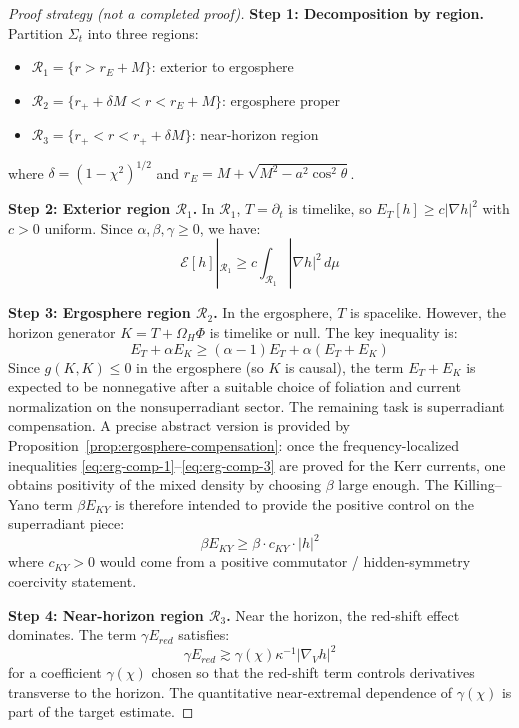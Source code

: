 \documentclass[12pt,a4paper]{article}
\begin{document}
\begin{proof}[Proof strategy (not a completed proof)]
\textbf{Step 1: Decomposition by region.}
Partition $\Sigma_t$ into three regions:
\begin{itemize}
    \item $\mathcal{R}_1 = \{r > r_E + M\}$: exterior to ergosphere
    \item $\mathcal{R}_2 = \{r_+ + \delta M < r < r_E + M\}$: ergosphere proper
    \item $\mathcal{R}_3 = \{r_+ < r < r_+ + \delta M\}$: near-horizon region
\end{itemize}
where $\delta = (1-\chi^2)^{1/2}$ and $r_E = M + \sqrt{M^2 - a^2\cos^2\theta}$.

\textbf{Step 2: Exterior region $\mathcal{R}_1$.}
In $\mathcal{R}_1$, $T = \partial_t$ is timelike, so $E_T[h] \geq c |\nabla h|^2$ with $c > 0$ uniform. Since $\alpha, \beta, \gamma \geq 0$, we have:
\begin{equation}
\mathcal{E}[h]|_{\mathcal{R}_1} \geq c \int_{\mathcal{R}_1} |\nabla h|^2 \, d\mu
\end{equation}

\textbf{Step 3: Ergosphere region $\mathcal{R}_2$.}
In the ergosphere, $T$ is spacelike. However, the horizon generator $K = T + \Omega_H \Phi$ is timelike or null. The key inequality is:
\begin{equation}
E_T + \alpha E_K \geq (\alpha - 1) E_T + \alpha (E_T + E_K)
\end{equation}
Since $g(K, K) \leq 0$ in the ergosphere (so $K$ is causal), the term $E_T + E_K$ is expected to be nonnegative after a suitable choice of foliation and current normalization on the nonsuperradiant sector. The remaining task is superradiant compensation. A precise abstract version is provided by Proposition~\ref{prop:ergosphere-compensation}: once the frequency-localized inequalities \eqref{eq:erg-comp-1}--\eqref{eq:erg-comp-3} are proved for the Kerr currents, one obtains positivity of the mixed density by choosing $\beta$ large enough. The Killing--Yano term $\beta E_{KY}$ is therefore intended to provide the positive control on the superradiant piece:
\begin{equation}
\beta E_{KY} \geq \beta \cdot c_{KY} \cdot |h|^2
\end{equation}
where $c_{KY} > 0$ would come from a positive commutator / hidden-symmetry coercivity statement.

\textbf{Step 4: Near-horizon region $\mathcal{R}_3$.}
Near the horizon, the red-shift effect dominates. The term $\gamma E_{red}$ satisfies:
\begin{equation}
\gamma E_{red} \gtrsim \gamma(\chi)\kappa^{-1} |\nabla_V h|^2
\end{equation}
for a coefficient $\gamma(\chi)$ chosen so that the red-shift term controls derivatives transverse to the horizon. The quantitative near-extremal dependence of $\gamma(\chi)$ is part of the target estimate.


\end{proof}
\end{document}
